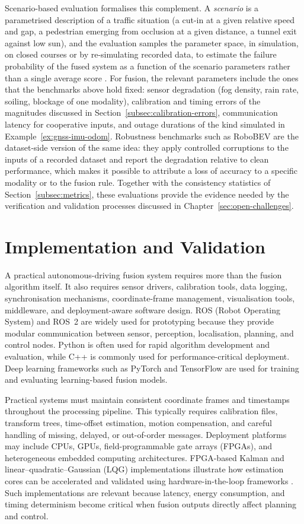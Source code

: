 Scenario-based evaluation formalises this complement. A \emph{scenario} is a parametrised description of a traffic situation (a cut-in at a given relative speed and gap, a pedestrian emerging from occlusion at a given distance, a tunnel exit against low sun), and the evaluation samples the parameter space, in simulation, on closed courses or by re-simulating recorded data, to estimate the failure probability of the fused system as a function of the scenario parameters rather than a single average score \cite{riedmaier2020_scenario}. For fusion, the relevant parameters include the ones that the benchmarks above hold fixed: sensor degradation (fog density, rain rate, soiling, blockage of one modality), calibration and timing errors of the magnitudes discussed in Section~\ref{subsec:calibration-errors}, communication latency for cooperative inputs, and outage durations of the kind simulated in Example~\ref{ex:gnss-imu-odom}. Robustness benchmarks such as RoboBEV \cite{dong2023_robobev} are the dataset-side version of the same idea: they apply controlled corruptions to the inputs of a recorded dataset and report the degradation relative to clean performance, which makes it possible to attribute a loss of accuracy to a specific modality or to the fusion rule. Together with the consistency statistics of Section~\ref{subsec:metrics}, these evaluations provide the evidence needed by the verification and validation processes discussed in Chapter~\ref{sec:open-challenges}.

\section{Implementation and Validation}

A practical autonomous-driving fusion system requires more than the fusion algorithm itself. It also requires sensor drivers, calibration tools, data logging, synchronisation mechanisms, coordinate-frame management, visualisation tools, middleware, and deployment-aware software design. ROS (Robot Operating System) and ROS~2 are widely used for prototyping because they provide modular communication between sensor, perception, localisation, planning, and control nodes. Python is often used for rapid algorithm development and evaluation, while C++ is commonly used for performance-critical deployment. Deep learning frameworks such as PyTorch and TensorFlow are used for training and evaluating learning-based fusion models.

Practical systems must maintain consistent coordinate frames and timestamps throughout the processing pipeline. This typically requires calibration files, transform trees, time-offset estimation, motion compensation, and careful handling of missing, delayed, or out-of-order messages. Deployment platforms may include CPUs, GPUs, field-programmable gate arrays (FPGAs), and heterogeneous embedded computing architectures. FPGA-based Kalman and linear--quadratic--Gaussian (LQG) implementations illustrate how estimation cores can be accelerated and validated using hardware-in-the-loop frameworks \cite{deliparaschos2016_jee_fpga}. Such implementations are relevant because latency, energy consumption, and timing determinism become critical when fusion outputs directly affect planning and control.

